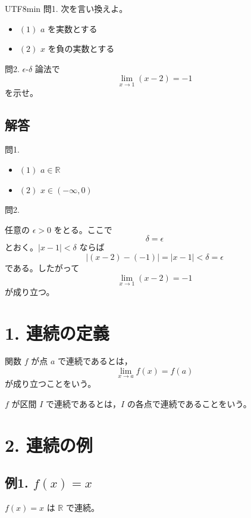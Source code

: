 \documentclass[a4paper,12pt]{article}
\begin{document}
\begin{CJK}{UTF8}{min}
問1. 次を言い換えよ。
\begin{itemize}
\item $(1)$ $a$ を実数とする
\item $(2)$ $x$ を負の実数とする
\end{itemize}

問2. $\epsilon$-$\delta$ 論法で
\[
\lim_{x\to 1}(x-2)=-1
\]
を示せ。

\subsection*{解答}

問1.
\begin{itemize}
\item $(1)$ $a\in \mathbb{R}$
\item $(2)$ $x\in (-\infty,0)$
\end{itemize}

問2.

任意の $\epsilon>0$ をとる。ここで
\[
\delta=\epsilon
\]
とおく。$|x-1|<\delta$ ならば
\[
|(x-2)-(-1)|=|x-1|<\delta=\epsilon
\]
である。したがって
\[
\lim_{x\to 1}(x-2)=-1
\]
が成り立つ。

\section*{1. 連続の定義}

\begin{definition}
関数 $f$ が点 $a$ で連続であるとは，
\[
\lim_{x \to a} f(x)=f(a)
\]
が成り立つことをいう。
\end{definition}

$f$ が区間 $I$ で連続であるとは，$I$ の各点で連続であることをいう。

\section*{2. 連続の例}

\subsection*{例1. $f(x)=x$}

$f(x)=x$ は $\mathbb{R}$ で連続。

\begin{center}
\end{center}


\end{CJK}
\end{document}
